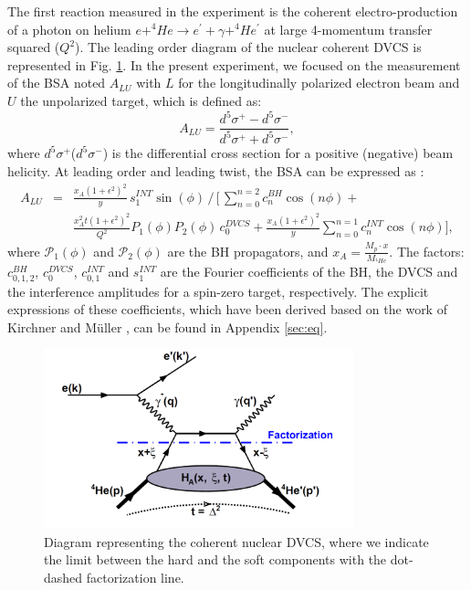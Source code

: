 \documentclass[aps,prc,preprint,superscriptaddress]{revtex4}
\begin{document}
The first reaction measured in the experiment is the coherent electro-production of a photon on helium
$e+^4\!\!He \rightarrow e^\prime+\gamma+^4\!\!He^\prime$ at large 4-momentum transfer squared ($Q^2$). The 
leading order diagram of the nuclear coherent DVCS is represented in Fig. \ref{fig:CohDiag}.
In the present experiment, we focused on the measurement of the BSA 
noted $A_{LU}$ with 
$L$ for the longitudinally polarized electron beam and $U$ the unpolarized target, which is defined as:  
\begin{equation}
A_{LU} = \frac{d^{5}\sigma^{+} - d^{5}\sigma^{-} }
              {d^{5}\sigma^{+} + d^{5}\sigma^{-}},
  \label{eq:BSA}
\end{equation}
where $d^{5}\sigma^{+}$($d^{5}\sigma^{-}$) is the differential cross section for a positive 
(negative) beam helicity. At leading order and leading twist, the BSA can be expressed as \cite{Kirchner:2003wt}:        
\begin{eqnarray}
\label{eq:coh_BSA}
A_{LU}& =& \frac{x_A(1+\epsilon^2)^2}{y} \, s_1^{INT} \sin(\phi) \, 
\bigg/ \, \bigg[ \, \sum_{n=0}^{n=2}c_n^{BH}\cos{(n\phi)} +  \\
& & \frac{x_A^2 t {(1+\epsilon^2)}^2}{Q^2} P_1(\phi) P_2(\phi) \, c_0^{DVCS} + 
\frac{x_A (1+\epsilon^2)^2}{y} \sum_{n=0}^{n=1} c_n^{INT} \cos{(n\phi)} \bigg],  \nonumber 
\end{eqnarray}
where $\mathcal{P}_1(\phi)$ and $\mathcal {P}_2(\phi)$ are the BH propagators, 
and $x_{A} = \frac{M_{p}\cdot x}{M_{^4\!He}}$. The factors: $c_{0,1,2}^{BH}$, 
$c_0^{DVCS}$, $c_{0,1}^{INT}$ and 
$s_1^{INT}$ are the Fourier coefficients of the BH, the DVCS and the 
interference amplitudes for a spin-zero target, respectively. The explicit 
expressions of these coefficients, which have been derived based on the work of 
Kirchner and Müller \cite{Kirchner:2003wt}, can be found in Appendix \ref{sec:eq}.

\begin{figure}[tbp!]
\center
\includegraphics[width=9cm]{DVCS_diagram.pdf}
\caption{Diagram representing the coherent nuclear DVCS, where we 
indicate the limit between the hard and the soft components with the dot-dashed factorization line.}
\label{fig:CohDiag}
\end{figure}
\end{document}
